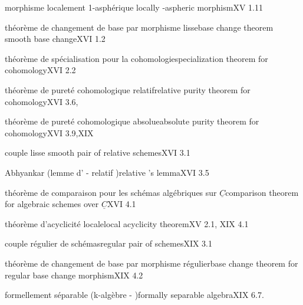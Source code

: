 morphisme  localement 1-asphérique\quad {} locally -aspheric morphism\quad XV 1.11


théorème de changement de base par morphisme lisse\quad base change theorem   smooth base change\quad XVI 1.2

théorème de spécialisation pour la cohomologie\quad specialization theorem for cohomology\quad XVI 2.2

théorème de pureté cohomologique relatif\quad relative purity theorem for cohomology\quad XVI 3.6, 

théorème de pureté cohomologique absolue\quad absolute purity theorem for cohomology\quad XVI 3.9,XIX 

couple lisse \quad smooth pair of relative schemes\quad XVI 3.1

 Abhyankar (lemme d' - relatif )\quad relative 's lemma\quad XVI 3.5

théorème de comparaison pour les schémas algébriques sur $\underline{C}$\quad comparison theorem for algebraic schemes over $\underline{C}$\quad XVI 4.1

théorème d'acyclicité locale\quad local acyclicity theorem\quad XV 2.1, XIX 4.1

couple régulier de schémas\quad regular pair of schemes\quad XIX 3.1

théorème de changement de base par morphisme régulier\quad base change theorem for regular base change morphism\quad XIX 4.2


formellement séparable (k-algèbre - )\quad formally separable algebra\quad XIX 6.7.

